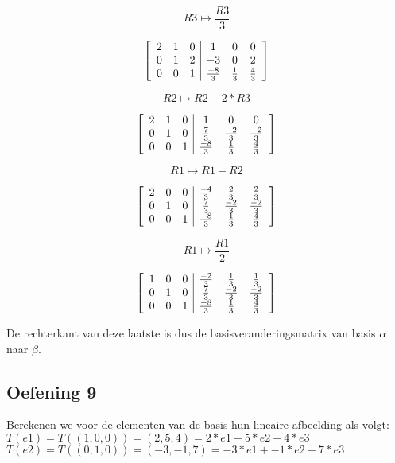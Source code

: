 \documentclass[lineaire_algebra_oplossingen.tex]{subfiles}
\begin{document}
\[R3 \mapsto \frac{R3}{3} \]

\[
\left[
\begin{array}{ c c c | c c c }
2 & 1 & 0 & 1 & 0 & 0\\
0 & 1 & 2 & -3 & 0 & 2\\
0 & 0 & 1 & \frac{-8}{3} & \frac{1}{3} & \frac{4}{3}
\end{array}
\right]
\]

\[R2 \mapsto R2 - 2*R3 \]

\[
\left[
\begin{array}{ c c c | c c c }
2 & 1 & 0 & 1 & 0 & 0\\
0 & 1 & 0 & \frac{7}{3} & \frac{-2}{3} & \frac{-2}{3}\\
0 & 0 & 1 & \frac{-8}{3} & \frac{1}{3} & \frac{4}{3}
\end{array}
\right]
\]

\[R1 \mapsto R1 - R2 \]

\[
\left[
\begin{array}{ c c c | c c c }
2 & 0 & 0 & \frac{-4}{3} & \frac{2}{3} & \frac{2}{3}\\
0 & 1 & 0 & \frac{7}{3} & \frac{-2}{3} & \frac{-2}{3}\\
0 & 0 & 1 & \frac{-8}{3} & \frac{1}{3} & \frac{4}{3}
\end{array}
\right]
\]

\[R1 \mapsto \frac{R1}{2}\]

\[
\left[
\begin{array}{ c c c | c c c }
1 & 0 & 0 & \frac{-2}{3} & \frac{1}{3} & \frac{1}{3}\\
0 & 1 & 0 & \frac{7}{3} & \frac{-2}{3} & \frac{-2}{3}\\
0 & 0 & 1 & \frac{-8}{3} & \frac{1}{3} & \frac{4}{3}
\end{array}
\right]
\]

De rechterkant van deze laatste is dus de basisveranderingsmatrix van basis $\alpha$ naar $\beta$.
\subsection{Oefening 9}

Berekenen we voor de elementen van de basis hun lineaire afbeelding als volgt:\\

$T(e1) = T( (1,0,0) ) = (2,5,4) = 2 * e1 + 5 * e2 + 4 * e3$\\

$T(e2) = T( (0,1,0) ) = (-3,-1,7) = -3 * e1 + -1 * e2 + 7 * e3$\\
\end{document}
